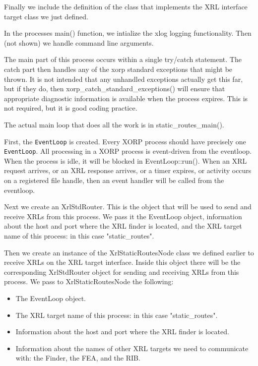 \documentclass[11pt]{article}
\begin{document}
Finally we include the definition of the class that implements the \SR
XRL interface target class we just defined.

In the processes {\stt main()} function, we intialize the {\stt xlog}
logging functionality.  Then (not shown) we handle command line
arguments.  

The main part of this process occurs within a single {\stt try/catch}
statement.  The {\stt catch} part then handles any of the xorp standard
exceptions that might be thrown.  It is not intended that any
unhandled exceptions actually get this far, but if they do, then {\stt
xorp\_catch\_standard\_exceptions()} will ensure that appropriate
diagnostic information is available when the process expires.  This is
not required, but it is good coding practice.

The actual main loop that does all the work is in {\stt
static\_routes\_main()}.

First, the {\tt EventLoop} is created.  Every XORP process should have
precisely one {\tt EventLoop}.  All processing in a XORP process is
event-driven from the eventloop.  When the process is idle, it will be
blocked in {\stt EventLoop::run()}.  When an XRL request arrives, or
an XRL response arrives, or a timer expires, or activity occurs on a
registered file handle, then an event handler will be called from the
eventloop.

Next we create an {\stt XrlStdRouter}.  This is the object that will
be used to send and receive XRLs from this process.  We pass it the
{\stt EventLoop} object, information about the host and port where the
XRL finder is located, and the XRL target name of this process: in
this case {\stt "static\_routes"}.

Then we create an instance of the {\stt XrlStaticRoutesNode} class we
defined earlier to receive XRLs on the \SR XRL target interface.
Inside this object there will be the corresponding {\stt XrlStdRouter}
object for sending and receiving XRLs from this process.
We pass to {\stt XrlStaticRoutesNode} the following:

\begin{itemize}

  \item The {\stt EventLoop} object.

  \item The XRL target name of this process: in this case
  {\stt "static\_routes"}.

  \item Information about the host and port where the XRL finder is located.

  \item Information about the names of other XRL targets we need to
  communicate with: the Finder, the FEA, and the RIB.

\end{itemize}
\end{document}

